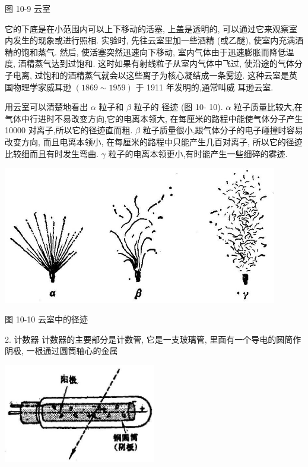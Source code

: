 \documentclass[10pt]{article}
\newcommand{\customfootnote}[1]{
  \let\thefootnote\relax\footnotetext{#1}
}
\begin{document}
图 10-9 云室

它的下底是在小范围内可以上下移动的活塞, 上盖是透明的, 可以通过它来观察室内发生的现象或进行照相. 实验时, 先往云室里加一些酒精 (或乙醚), 使室内充满酒精的饱和蒸气. 然后, 使活塞突然迅速向下移动, 室内气体由于迅速膨胀而降低温度, 酒精蒸气达到过饱和. 这时如果有射线粒子从室内气体中飞过, 使沿途的气体分子电离, 过饱和的酒精蒸气就会以这些离子为核心凝结成一条雾迹. 这种云室是英国物理学家威耳逊 \(\left( {{1869} \sim {1959}}\right)\) 于 1911 年发明的,通常叫威 耳逊云室.

\customfootnote{

① 参看上册第 297 页.

}

用云室可以清楚地看出 \(\alpha\) 粒子和 \(\beta\) 粒子的 径迹 (图 10- 10). \(\alpha\) 粒子质量比较大,在气体中行进时不易改变方向,它的电离本领大, 在每厘米的路程中能使气体分子产生 10000 对离子,所以它的径迹直而粗. \(\beta\) 粒子质量很小,跟气体分子的电子碰撞时容易改变方向, 而且电离本领小, 在每厘米的路程中只能产生几百对离子, 所以它的径迹比较细而且有时发生弯曲. \(\gamma\) 粒子的电离本领更小,有时能产生一些细碎的雾迹.

\begin{center}
\includegraphics[max width=0.9\textwidth]{images/01913056-1f15-74d8-9184-9aab52c9d66b_346_212819.jpg}
\end{center}

图 10-10 云室中的径迹

2. 计数器 计数器的主要部分是计数管, 它是一支玻璃管, 里面有一个导电的圆筒作阴极, 一根通过圆筒轴心的金属

\begin{center}
\includegraphics[max width=0.5\textwidth]{images/01913056-1f15-74d8-9184-9aab52c9d66b_347_674244.jpg}
\end{center}
\end{document}
